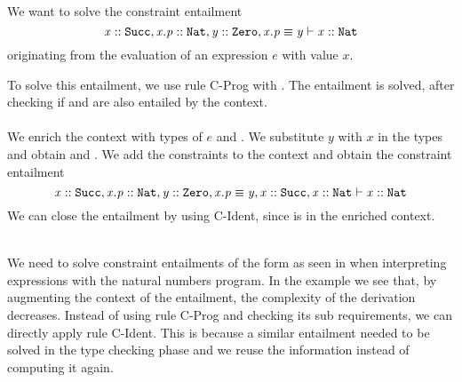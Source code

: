 \begin{example}\quad\\
\label{ex:enrich-context}
%
%
%
%
We want to solve the constraint entailment
\[ \mathit{x} :: \mathit{\texttt{Succ}}, \mathit{x.p} :: \mathit{\texttt{Nat}}, \mathit{y} :: \mathit{\texttt{Zero}}, \mathit{x.p} \equiv \mathit{y} \vdash \mathit{x} :: \mathit{\texttt{Nat}} \]
originating from the evaluation of an expression $e$ with value $x$.

To solve this entailment, we use rule C-Prog
with .
The entailment is solved, after checking if
 and 
are also entailed by the context.\\
\\
We enrich the context with types of $e$
 and
.
We substitute $y$ with $x$ in the types and obtain
 and
.
We add the constraints to the context and obtain the constraint entailment
\[ \mathit{x} :: \mathit{\texttt{Succ}}, \mathit{x.p} :: \mathit{\texttt{Nat}}, \mathit{y} :: \mathit{\texttt{Zero}}, \mathit{x.p} \equiv \mathit{y},
            \mathit{x} :: \mathit{\texttt{Succ}},\mathit{x} :: \mathit{\texttt{Nat}} \vdash \mathit{x} :: \mathit{\texttt{Nat}} \]
We can close the entailment by using C-Ident,
since  is in the enriched context.
\end{example}
\quad\\
%
We need to solve constraint entailments of the form
as seen in  when interpreting
expressions with the natural numbers program.
In the example we see that, by augmenting the
context of the entailment,
the complexity of the derivation decreases.
Instead of using rule C-Prog and checking its
sub requirements, we can directly apply
rule C-Ident.
This is because a similar entailment
needed to be solved in the type checking phase
and we reuse the information instead of computing it again.
